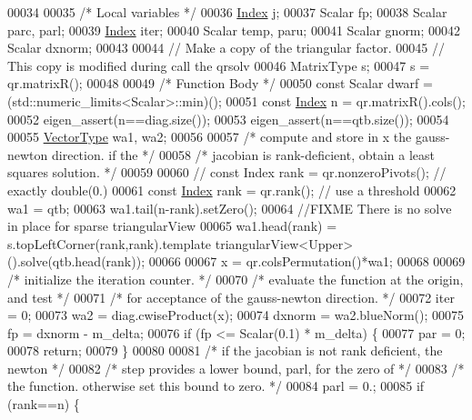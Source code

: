 \begin{DoxyCode}
00034 
00035     \textcolor{comment}{/* Local variables */}
00036     \hyperlink{namespace_eigen_a62e77e0933482dafde8fe197d9a2cfde}{Index} j;
00037     Scalar fp;
00038     Scalar parc, parl;
00039     \hyperlink{namespace_eigen_a62e77e0933482dafde8fe197d9a2cfde}{Index} iter;
00040     Scalar temp, paru;
00041     Scalar gnorm;
00042     Scalar dxnorm;
00043     
00044     \textcolor{comment}{// Make a copy of the triangular factor. }
00045     \textcolor{comment}{// This copy is modified during call the qrsolv}
00046     MatrixType s;
00047     s = qr.matrixR();
00048 
00049     \textcolor{comment}{/* Function Body */}
00050     \textcolor{keyword}{const} Scalar dwarf = (std::numeric\_limits<Scalar>::min)();
00051     \textcolor{keyword}{const} \hyperlink{namespace_eigen_a62e77e0933482dafde8fe197d9a2cfde}{Index} n = qr.matrixR().cols();
00052     eigen\_assert(n==diag.size());
00053     eigen\_assert(n==qtb.size());
00054 
00055     \hyperlink{struct_vector_type}{VectorType}  wa1, wa2;
00056 
00057     \textcolor{comment}{/* compute and store in x the gauss-newton direction. if the */}
00058     \textcolor{comment}{/* jacobian is rank-deficient, obtain a least squares solution. */}
00059 
00060     \textcolor{comment}{//    const Index rank = qr.nonzeroPivots(); // exactly double(0.)}
00061     \textcolor{keyword}{const} \hyperlink{namespace_eigen_a62e77e0933482dafde8fe197d9a2cfde}{Index} rank = qr.rank(); \textcolor{comment}{// use a threshold}
00062     wa1 = qtb;
00063     wa1.tail(n-rank).setZero();
00064     \textcolor{comment}{//FIXME There is no solve in place for sparse triangularView}
00065     wa1.head(rank) = s.topLeftCorner(rank,rank).template triangularView<Upper>().solve(qtb.head(rank));
00066 
00067     x = qr.colsPermutation()*wa1;
00068 
00069     \textcolor{comment}{/* initialize the iteration counter. */}
00070     \textcolor{comment}{/* evaluate the function at the origin, and test */}
00071     \textcolor{comment}{/* for acceptance of the gauss-newton direction. */}
00072     iter = 0;
00073     wa2 = diag.cwiseProduct(x);
00074     dxnorm = wa2.blueNorm();
00075     fp = dxnorm - m\_delta;
00076     \textcolor{keywordflow}{if} (fp <= Scalar(0.1) * m\_delta) \{
00077       par = 0;
00078       \textcolor{keywordflow}{return};
00079     \}
00080 
00081     \textcolor{comment}{/* if the jacobian is not rank deficient, the newton */}
00082     \textcolor{comment}{/* step provides a lower bound, parl, for the zero of */}
00083     \textcolor{comment}{/* the function. otherwise set this bound to zero. */}
00084     parl = 0.;
00085     \textcolor{keywordflow}{if} (rank==n) \{

\end{DoxyCode}
